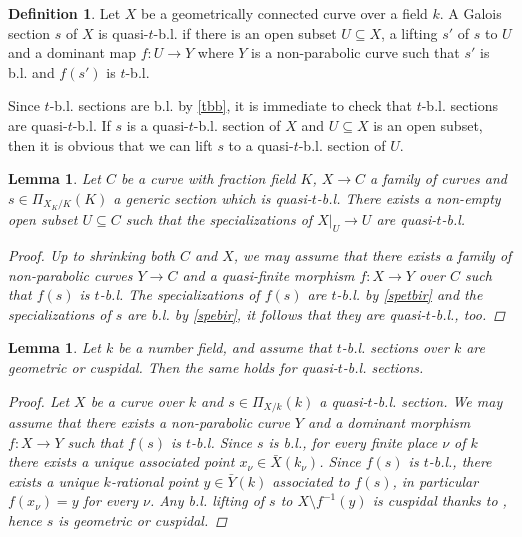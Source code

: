 \documentclass[11pt]{amsart}
\theoremstyle{plain}
\newtheorem{lemma}[theorem]{Lemma}
\theoremstyle{definition}
\newtheorem{definition}[theorem]{Definition}
\newcommand{\1}{\mathbb{1}}
\newcommand{\s}{\subseteq}
\begin{document}
\begin{definition}
	Let $X$ be a geometrically connected curve over a field $k$. A Galois section $s$ of $X$ is quasi-$t$-b.l. if there is an open subset $U\s X$, a lifting $s'$ of $s$ to $U$ and a dominant map $f:U\to Y$ where $Y$ is a non-parabolic curve such that $s'$ is b.l. and $f(s')$ is $t$-b.l.
\end{definition}

Since $t$-b.l. sections are b.l. by \autoref{tbb}, it is immediate to check that $t$-b.l. sections are quasi-$t$-b.l. If $s$ is a quasi-$t$-b.l. section of $X$ and $U\s X$ is an open subset, then it is obvious that we can lift $s$ to a quasi-$t$-b.l. section of $U$.

\begin{lemma}\label{spequasi}
	Let $C$ be a curve with fraction field $K$, $X\to C$ a family of curves and $s\in\Pi_{X_{K}/K}(K)$ a generic section which is quasi-$t$-b.l. There exists a non-empty open subset $U\s C$ such that the specializations of $X|_{U}\to U$ are quasi-$t$-b.l.
	\begin{proof}
		Up to shrinking both $C$ and $X$, we may assume that there exists a family of non-parabolic curves $Y\to C$ and a quasi-finite morphism $f:X\to Y$ over $C$ such that $f(s)$ is $t$-b.l. The specializations of $f(s)$ are $t$-b.l. by \autoref{spetbir} and the specializations of $s$ are b.l. by \autoref{spebir}, it follows that they are quasi-$t$-b.l., too.
	\end{proof}
\end{lemma}

\begin{lemma}\label{quasinf}
	Let $k$ be a number field, and assume that $t$-b.l. sections over $k$ are geometric or cuspidal. Then the same holds for quasi-$t$-b.l. sections.
	\begin{proof}
		Let $X$ be a curve over $k$ and $s\in\Pi_{X/k}(k)$ a quasi-$t$-b.l. section. We may assume that there exists a non-parabolic curve $Y$ and a dominant morphism $f:X\to Y$ such that $f(s)$ is $t$-b.l. Since $s$ is b.l., for every finite place $\nu$ of $k$ there exists a unique associated point $x_{\nu}\in \bar{X}(k_{\nu})$. Since $f(s)$ is $t$-b.l., there exists a unique $k$-rational point $y\in \bar{Y}(k)$ associated to $f(s)$, in particular $f(x_{\nu})=y$ for every $\nu$. Any b.l. lifting of $s$ to $X\setminus f^{-1}(y)$ is cuspidal thanks to \cite[Theorem B]{sti15}, hence $s$ is geometric or cuspidal.
	\end{proof}
\end{lemma}
\end{document}
